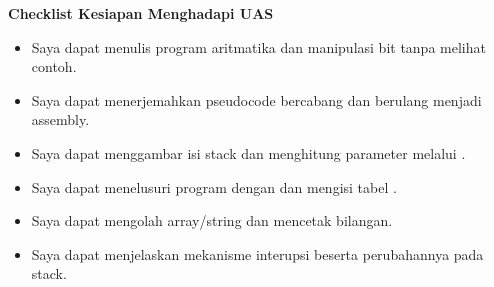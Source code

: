 \begin{checklistbox}
\vspace{1.1em}
\textbf{Checklist Kesiapan Menghadapi UAS}

\begin{itemize}
    \item[\checkbox] Saya dapat menulis program aritmatika dan
          manipulasi bit tanpa melihat contoh.
    \item[\checkbox] Saya dapat menerjemahkan pseudocode bercabang
          dan berulang menjadi assembly.
    \item[\checkbox] Saya dapat menggambar isi stack dan menghitung
          parameter melalui .
    \item[\checkbox] Saya dapat menelusuri program dengan
           dan mengisi tabel .
    \item[\checkbox] Saya dapat mengolah array/string dan mencetak
          bilangan.
    \item[\checkbox] Saya dapat menjelaskan mekanisme interupsi
          beserta perubahannya pada stack.
\end{itemize}
\end{checklistbox}
